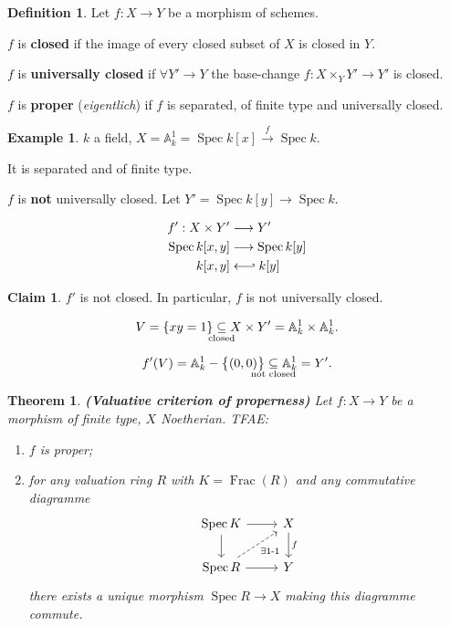 \documentclass[12pt]{article}
\DeclareMathOperator{\Spec}{Spec}
\DeclareMathOperator{\Frac}{Frac}
\newtheorem*{theorem}{Theorem}
\theoremstyle{definition}
\newtheorem*{definition}{Definition}
\newtheorem*{claim}{Claim}
\newtheorem*{example}{Example}
\begin{document}
\begin{definition}
Let $f:X\rightarrow Y$ be a morphism of schemes.

$f$ is \textbf{closed} if the image of every closed subset of $X$ is closed in $Y$.

$f$ is \textbf{universally closed} if $\forall Y'\rightarrow Y$ the base-change $f:X\times_YY'\rightarrow Y'$ is closed.

$f$ is \textbf{proper} (\emph{eigentlich}) if $f$ is separated, of finite type and universally closed.
\end{definition}

\begin{example}
$k$ a field, $X=\mathbb{A}_k^1=\Spec k[x]\xrightarrow{f}\Spec k$.

It is separated and of finite type.

$f$ is \textbf{not} universally closed. Let $Y'=\Spec k[y]\rightarrow\Spec k$.

\begin{align*}
f':X\times Y'&\longrightarrow Y'\\
\Spec k[x,y]&\longrightarrow\Spec k[y]\\
k[x,y]&\longleftarrow\joinrel\rhook k[y]
\end{align*}

\begin{claim}
$f'$ is not closed. In particular, $f$ is not universally closed.
\end{claim}

\[V=\{xy=1\}\underset{\mathclap{\text{closed}}}{\subseteq}X\times Y'=\mathbb{A}_k^1\times\mathbb{A}_k^1.\]

\[f'(V)=\mathbb{A}_k^1-\big\{(0,0)\big\}\underset{\mathclap{\text{not closed}}}{\subseteq}\mathbb{A}_k^1=Y'.\]
\end{example}

\begin{theorem}
\emph{\textbf{(Valuative criterion of properness)}} Let $f:X\rightarrow Y$ be a morphism of finite type, $X$ Noetherian. TFAE:
\begin{enumerate}[label=\arabic*)]
\item $f$ is proper;
\item for any valuation ring $R$ with $K=\Frac(R)$ and any commutative diagramme
\[
\begin{tikzcd}
\Spec K\arrow[r]\arrow[d]&X\arrow[d,"f"]\\
\Spec R\arrow[r]\arrow[ru,dashed,"\exists1\text{-}1",swap]&Y
\end{tikzcd}
\]
there exists a unique morphism $\Spec R\rightarrow X$ making this diagramme commute.
\end{enumerate}
\end{theorem}
\end{document}
